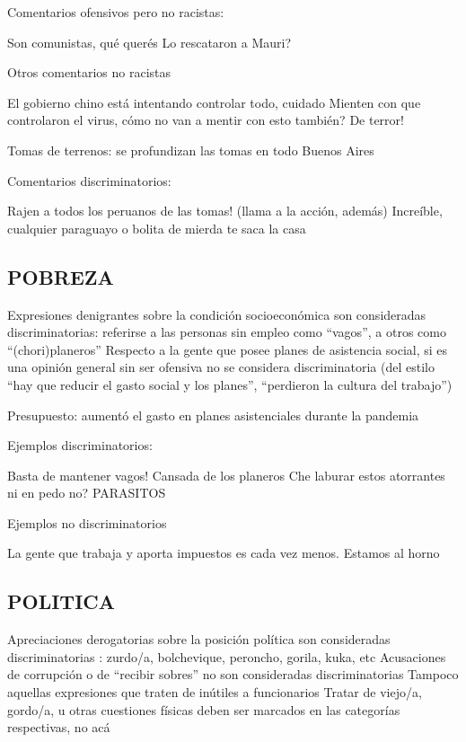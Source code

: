 Comentarios ofensivos pero no racistas:

Son comunistas, qué querés
Lo rescataron a Mauri?




Otros comentarios no racistas

El gobierno chino está intentando controlar todo, cuidado
Mienten con que controlaron el virus, cómo no van a mentir con esto también?
De terror!


Tomas de terrenos: se profundizan las tomas en todo Buenos Aires


Comentarios discriminatorios:

Rajen a todos los peruanos de las tomas! (llama a la acción, además)
Increíble, cualquier paraguayo o bolita de mierda te saca la casa

\subsection{POBREZA}

Expresiones denigrantes sobre la condición socioeconómica son consideradas discriminatorias: referirse a las personas sin empleo como “vagos”, a otros como “(chori)planeros”
Respecto a la gente que posee planes de asistencia social, si es una opinión general sin ser ofensiva no se considera discriminatoria (del estilo “hay que reducir el gasto social y los planes”, “perdieron la cultura del trabajo”)

Presupuesto: aumentó el gasto en planes asistenciales durante la pandemia

Ejemplos discriminatorios:

Basta de mantener vagos!
Cansada de los planeros
Che laburar estos atorrantes ni en pedo no?
PARASITOS

Ejemplos no discriminatorios

La gente que trabaja y aporta impuestos es cada vez menos. Estamos al horno



\subsection{POLITICA}

Apreciaciones derogatorias sobre la posición política son consideradas discriminatorias : zurdo/a, bolchevique, peroncho, gorila, kuka, etc
Acusaciones de corrupción o de “recibir sobres” no son consideradas discriminatorias
Tampoco aquellas expresiones que traten de inútiles a funcionarios
Tratar de viejo/a, gordo/a, u otras cuestiones físicas deben ser marcados en las categorías respectivas, no acá

